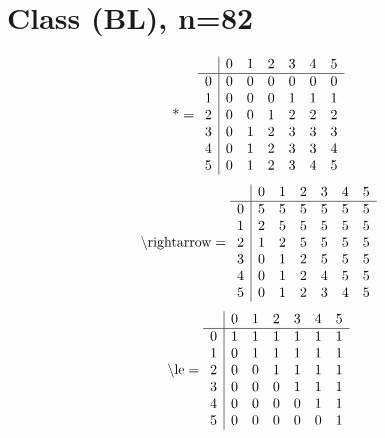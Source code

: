 \documentclass[11pt]{article}
\begin{document}
\section{Class (BL), n=82}
\[\text{*} = 
\begin{array}{r | r r r r r r}
 & 0 & 1 & 2 & 3 & 4 & 5 \\ \hline
0 & 0 & 0 & 0 & 0 & 0 & 0 \\
1 & 0 & 0 & 0 & 1 & 1 & 1 \\
2 & 0 & 0 & 1 & 2 & 2 & 2 \\
3 & 0 & 1 & 2 & 3 & 3 & 3 \\
4 & 0 & 1 & 2 & 3 & 3 & 4 \\
5 & 0 & 1 & 2 & 3 & 4 & 5 \\
\end{array}
\]
\[\text{\textbackslash rightarrow} = 
\begin{array}{r | r r r r r r}
 & 0 & 1 & 2 & 3 & 4 & 5 \\ \hline
0 & 5 & 5 & 5 & 5 & 5 & 5 \\
1 & 2 & 5 & 5 & 5 & 5 & 5 \\
2 & 1 & 2 & 5 & 5 & 5 & 5 \\
3 & 0 & 1 & 2 & 5 & 5 & 5 \\
4 & 0 & 1 & 2 & 4 & 5 & 5 \\
5 & 0 & 1 & 2 & 3 & 4 & 5 \\
\end{array}
\]
\[\text{\textbackslash le} = 
\begin{array}{r | r r r r r r}
 & 0 & 1 & 2 & 3 & 4 & 5 \\ \hline
0 & 1 & 1 & 1 & 1 & 1 & 1 \\
1 & 0 & 1 & 1 & 1 & 1 & 1 \\
2 & 0 & 0 & 1 & 1 & 1 & 1 \\
3 & 0 & 0 & 0 & 1 & 1 & 1 \\
4 & 0 & 0 & 0 & 0 & 1 & 1 \\
5 & 0 & 0 & 0 & 0 & 0 & 1 \\
\end{array}
\]
\end{document}
